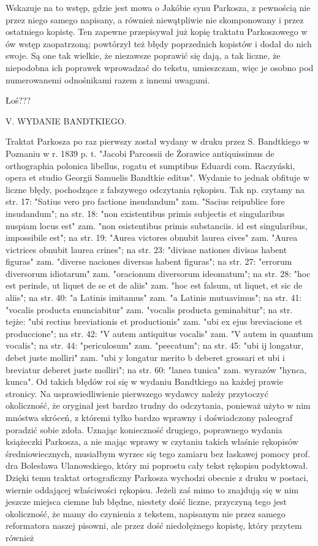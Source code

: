 Wskazuje na to wstęp, gdzie jest mowa o Jakóbie synu Parkosza, z pewnością nie przez niego samego napisany, a również niewątpliwie nie skomponowany i przez ostatniego kopistę. Ten zapewne przepisywał już kopię traktatu Parkoszowego w ów wstęp zaopatrzoną; powtórzył też błędy poprzednich kopistów i dodał do nich swoje. Są one tak wielkie, że niezawsze poprawić się dają, a tak liczne, że niepodobna ich poprawek wprowadzać do tekstu, umieszczam, więc je osobno pod numerowanemi odnośnikami razem z innemi uwagami.

Łoś???

V. WYDANIE BANDTKIEGO.

 

Traktat Parkosza po raz pierwszy został wydany w druku przez S. Bandtkiego w Poznaniu w r. 1839 p. t. "Jacobi Parcossii de Żorawice antiquissimus de orthographia polonica libellus, rogatu et sumptibus Eduardi com. Raczyński, opera et studio Georgii Samuelis Bandtkie editus". Wydanie to jednak obfituje w liczne błędy, pochodzące z fałszywego odczytania rękopisu. Tak np. czytamy na str. 17: "Satius vero pro factione insudandum" zam. "Sacius reipublice fore insudandum"; na str. 18: "non existentibus primis subjectis et singularibus nuspiam locus est" zam. "non esistentibus primis substanciis. id est singularibus, impossibile est"; na str. 19: "Aurea victores obnubit laurea cives" zam. "Aurea victrices obnubit laurea crines"; na str. 23: "divisae nationes divisas habent figuras" zam. "diverse naciones diversas habent figuras"; na str. 27: "errorum diversorum idiotarum" zam. "oracionum diversorum ideomatum"; na str. 28: "hoc est perinde, ut liquet de se et de aliis" zam. "hoc est falsum, ut liquet, et sic de aliis"; na str. 40: "a Latinis imitamus" zam. "a Latinis mutuavimus"; na str. 41: "vocalis producta enunciabitur" zam. "vocalis producta geminabitur"; na str. tejże: "ubi rectius breviationis et productionis" zam. "ubi ex ejus breviacione et produccione"; na str. 42: "V autem antiquitus vocalis" zam. "V autem in quantum vocalis"; na str. 44: "periculosum" zam. "peecatum"; na str. 45: "ubi ij longatur, debet juste molliri" zam. "ubi y longatur merito b deberet grossari et ubi i breviatur deberet juste molliri"; na str. 60: "lanea tunica" zam. wyrazów "hynca, kunca". Od takich błędów roi się w wydaniu Bandtkiego na każdej prawie stronicy. Na usprawiedliwienie pierwszego wydawcy należy przytoczyć okoliczność, że oryginał jest bardzo trudny do odczytania, ponieważ użyto w nim mnóstwa skróceń, z któremi tylko bardzo wprawny i doświadczony paleograf poradzić sobie zdoła. Uznając konieczność drugiego, poprawnego wydania książeczki Parkosza, a nie mając wprawy w czytaniu takich właśnie rękopisów średniowiecznych, musiałbym wyrzec się tego zamiaru bez łaskawej pomocy prof. dra Bolesława Ulanowskiego, który mi poprostu cały tekst rękopisu podyktował. Dzięki temu traktat ortograficzny Parkosza wychodzi obecnie z druku w postaci, wiernie oddającej właściwości rękopisu. Jeżeli zaś mimo to znajdują się w nim jeszcze miejsca ciemne lub błędne, niestety dość liczne, przyczyną tego jest okoliczność, że mamy do czynienia z tekstem, napisanym nie przez samego reformatora naszej pisowni, ale przez dość niedołężnego kopistę, który przytem również 